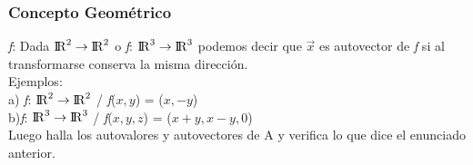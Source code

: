 \documentclass[11pt]{article}
\begin{document}
\subsubsection{Concepto Geométrico}
\textit{f}: Dada ${\rm I\!R}^{2}\rightarrow {\rm I\!R}^{2}$ o \textit{f}: ${\rm I\!R}^{3}\rightarrow {\rm I\!R}^{3}$ podemos decir que $\vec{x}$ es autovector de \textit{f} si al transformarse conserva la misma dirección.\\
Ejemplos:\\
a) \textit{f}: ${\rm I\!R}^{2}\rightarrow {\rm I\!R}^{2}$ / \textit{f}($x,y$) = ($x, -y$)\\
b)\textit{f}: ${\rm I\!R}^{3}\rightarrow {\rm I\!R}^{3}$ / \textit{f}($x,y,z$) = ($x+y, x-y, 0$)\\
Luego halla los autovalores y autovectores de A y verifica lo que dice el enunciado anterior.
\end{document}

